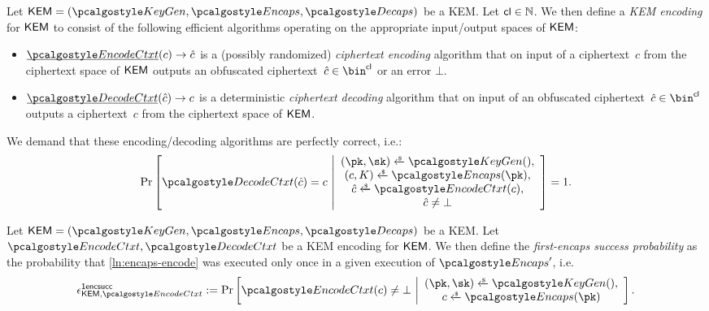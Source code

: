 \begin{definition}
\label{def:kem-encoding}
    Let $\KEM = (\kgen, \encaps, \decaps)$ be a KEM.
    Let $\mathsf{cl} \in \mathbb N$.
    We then define a \emph{KEM encoding} for $\mathsf{KEM}$ to consist of the following efficient algorithms operating on the appropriate input/output spaces of $\mathsf{KEM}$:
    \begin{itemize}
        \item $\ul{\encodectxt}(c) \to \hat c$
        is a (possibly randomized) \emph{ciphertext encoding} algorithm that on input of a ciphertext~$c$ from the ciphertext space of $\mathsf{KEM}$ outputs an obfuscated ciphertext~$\hat c \in \bin^{\obfctxtlen}$ or an error $\bot$.
        \item $\ul{\decodectxt}(\hat c) \to c$
        is a deterministic \emph{ciphertext decoding} algorithm that on input of an obfuscated ciphertext~$\hat c \in \bin^{\obfctxtlen}$ outputs a ciphertext~$c$ from the ciphertext space of $\mathsf{KEM}$.
    \end{itemize}

    We demand that these encoding/decoding algorithms are perfectly correct, i.e.:
    \[
        \Pr\left[
            \decodectxt(\hat c) = c
        ~\middle|
            \begin{array}{c}
                (\pk, \sk) \getsr \kgen(),\\
                (c, K) \getsr \encaps(\pk),\\
                \hat c \getsr \encodectxt(c),\\
                \hat c \neq \bot
            \end{array}
        \right] = 1.
    \]
\end{definition}

\begin{definition}
\label{def:first-encaps-success}
    Let $\KEM = (\kgen, \encaps, \decaps)$ be a KEM.
    Let $\encodectxt, \decodectxt$ be a KEM encoding for $\mathsf{KEM}$.
    We then define the \emph{first-encaps success probability} as the probability that \cref{ln:encaps-encode} was executed only once in a given execution of $\encaps'$, i.e.
    \[
        \epsilon^\firstencapssuccess_{\KEM,\encodectxt} :=
        \Pr\left[
            \encodectxt(c) \neq \bot
        ~\middle|
            \begin{array}{c}
                (\pk, \sk) \getsr \kgen(), \\
                c \getsr \encaps(\pk)
            \end{array}
        \right].
    \]
\end{definition}

